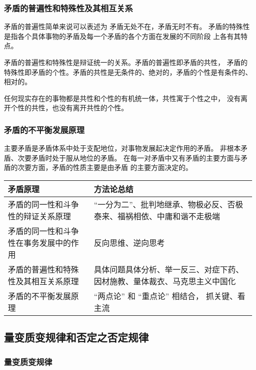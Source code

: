 \documentclass[utf-8, 10pt]{article}
\begin{document}
\subsubsection{矛盾的普遍性和特殊性及其相互关系}

矛盾的普遍性简单来说可以表述为 {\kaishu 矛盾无处不在，矛盾无时不有}。
矛盾的特殊性是指各个具体事物的矛盾及每一个矛盾的各个方面在发展的不同阶段
上各有其特点。

矛盾的普遍性和特殊性是辩证统一的关系。矛盾的普遍性即矛盾的共性，
矛盾的特殊性即矛盾的个性。矛盾的共性是无条件的、绝对的，矛盾的个性是有条件的、
相对的。

任何现实存在的事物都是共性和个性的有机统一体，共性寓于个性之中，
没有离开个性的共性，也没有离开共性的个性。

\subsubsection{矛盾的不平衡发展原理}

主要矛盾是矛盾体系中处于支配地位，对事物发展起决定作用的矛盾。
非根本矛盾、次要矛盾时处于服从地位的矛盾。
在每一对矛盾中又有矛盾的主要方面与矛盾的次要方面，矛盾的性质主要是由矛盾
的主要方面决定的。

{ %
\label{矛盾分析方法} %
\begin{longtable}{p{}p{}}
    \toprule
    \textbf{矛盾原理} & \textbf{方法论总结} \\
    \toprule
    \endhead
    \bottomrule
    \endfoot

    矛盾的同一性和斗争性的辩证关系原理 & “一分为二”、批判地继承、物极必反、否极泰来、福祸相依、中庸和谐不走极端 \\ 
    矛盾的同一性和斗争性在事务发展中的作用 & 反向思维、逆向思考 \\ 
    矛盾的普遍性和特殊性及其相互关系原理 & 具体问题具体分析、举一反三、对症下药、因材施教、量体裁衣、马克思主义中国化 \\ 
    矛盾的不平衡发展原理 & “两点论” 和 “重点论” 相结合， 抓关键、看主流 \\
\end{longtable}}

\subsection{量变质变规律和否定之否定规律}

\subsubsection{量变质变规律}
\end{document}
